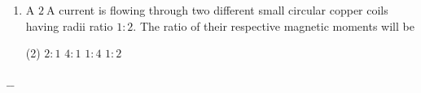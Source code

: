 \documentclass[preview, border={10mm, 5mm, 10mm, 10mm}]{standalone}
\title{\textsc{}}
\begin{document}
\begin{enumerate}[leftmargin=*]
\item[$\Omega.$] A $2 \ \mathrm{A}$ current is flowing through two different small circular copper coils having radii ratio $1 : 2$. The ratio of their respective magnetic moments will be
\begin{tasks}(2)
    \task $2 : 1$
    \task $4 : 1$
    \task $1 : 4$ 
    \task $1 : 2$
\end{tasks}
\end{enumerate}
\hfill $\_\_$
\end{document}
